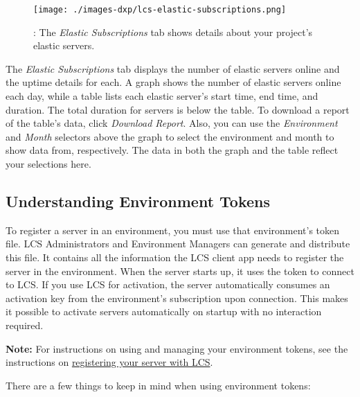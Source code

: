 \noindent\hrulefill

\begin{figure}
\centering
\texttt{[image: ./images-dxp/lcs-elastic-subscriptions.png]}
\caption{: The \emph{Elastic Subscriptions} tab shows details about your
project's elastic servers.}
\end{figure}

The \emph{Elastic Subscriptions} tab displays the number of elastic
servers online and the uptime details for each. A graph shows the number
of elastic servers online each day, while a table lists each elastic
server's start time, end time, and duration. The total duration for
servers is below the table. To download a report of the table's data,
click \emph{Download Report}. Also, you can use the \emph{Environment}
and \emph{Month} selectors above the graph to select the environment and
month to show data from, respectively. The data in both the graph and
the table reflect your selections here.

\subsection{Understanding Environment
Tokens}\label{understanding-environment-tokens}

To register a server in an environment, you must use that environment's
token file. LCS Administrators and Environment Managers can generate and
distribute this file. It contains all the information the LCS client app
needs to register the server in the environment. When the server starts
up, it uses the token to connect to LCS. If you use LCS for activation,
the server automatically consumes an activation key from the
environment's subscription upon connection. This makes it possible to
activate servers automatically on startup with no interaction required.

\noindent\hrulefill

\textbf{Note:} For instructions on using and managing your environment
tokens, see the instructions on
\href{/docs/7-0/deploy/-/knowledge_base/d/registering-your-dxp-server-with-lcs}{registering
your server with LCS}.

\noindent\hrulefill

There are a few things to keep in mind when using environment tokens:

